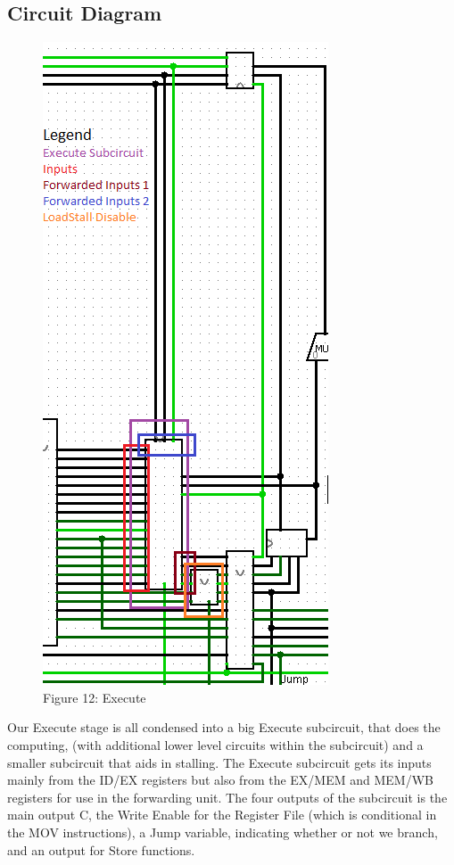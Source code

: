 \documentclass{article}
\begin{document}
\subsection{Circuit Diagram}
\begin{figure}
\vspace{-3.8cm}
\begin{center}
\includegraphics[width=.23\textwidth]{ALU.png} \\
Figure 12: Execute
\end{center}
\vspace{-.8cm}
\end{figure}
Our Execute stage is all condensed into a big Execute subcircuit, that does the computing, (with additional lower level circuits within the subcircuit) and a smaller subcircuit that aids in stalling. The Execute subcircuit gets its inputs mainly from the ID/EX registers but also from the EX/MEM and MEM/WB registers for use in the forwarding unit. The four outputs of the subcircuit is the main output C, the Write Enable for the Register File (which is conditional in the MOV instructions), a Jump variable, indicating whether or not we branch, and an output for Store functions. 
\end{document}
